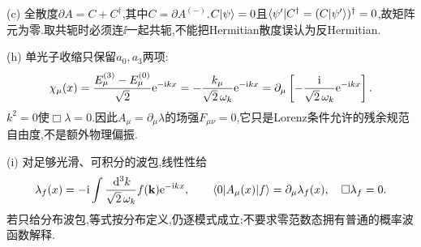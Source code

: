 \begin{solution}
(c) 全散度$\partial A=C+C^\dagger$,其中$C=\partial A^{(-)}$.$C\lvert \psi\rangle=0$且$\langle \psi'\rvert C^\dagger=(C\lvert \psi'\rangle)^\dagger=0$,故矩阵元为零.取共轭时必须连$\ii$一起共轭,不能把Hermitian散度误认为反Hermitian.

(h) 单光子收缩只保留$a_0,a_3$两项:
\[
 \chi_\mu(x)=\frac{E_\mu^{(3)}-E_\mu^{(0)}}{\sqrt2}\mathrm e^{-\mathrm i kx}
 =-\frac{k_\mu}{\sqrt2\,\omega_k}\mathrm e^{-\mathrm i kx}
 =\partial_\mu\left[-\frac{\mathrm i}{\sqrt2\,\omega_k}\mathrm e^{-\mathrm i kx}\right].
\]
$k^2=0$使$\Box\lambda=0$.因此$A_\mu=\partial_\mu\lambda$的场强$F_{\mu\nu}=0$,它只是Lorenz条件允许的残余规范自由度,不是额外物理偏振.

(i) 对足够光滑、可积分的波包,线性性给
\[
 \lambda_f(x)=-\mathrm i\int\frac{\,\mathrm d^3k}{\sqrt2\,\omega_k}f(\mathbf k)\mathrm e^{-\mathrm i kx},
 \qquad\langle 0\rvert A_\mu(x)\lvert f\rangle=\partial_\mu\lambda_f(x),\quad\Box\lambda_f=0.
\]
若只给分布波包,等式按分布定义,仍逐模式成立;不要求零范数态拥有普通的概率波函数解释.
\end{solution}

